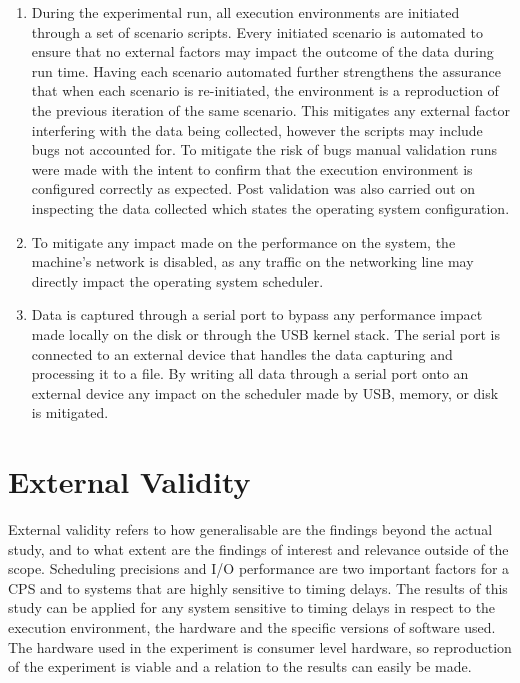 \begin{enumerate}
\item{During the experimental run, all execution environments are initiated through a set of scenario scripts. Every initiated scenario is automated to ensure that no external factors may impact the outcome of the data during run time. Having each scenario automated further strengthens the assurance that when each scenario is re-initiated, the environment is a reproduction of the previous iteration of the same scenario. This mitigates any external factor interfering with the data being collected, however the scripts may include bugs not accounted for. To mitigate the risk of bugs manual validation runs were made with the intent to confirm that the execution environment is configured correctly as expected. Post validation was also carried out on inspecting the data collected which states the operating system configuration.}
\item{To mitigate any impact made on the performance on the system, the machine's network is disabled, as any traffic on the networking line may directly impact the operating system scheduler.}
\item{Data is captured through a serial port to bypass any performance impact made locally on the disk or through the USB kernel stack. The serial port is connected to an external device that handles the data capturing and processing it to a file. By writing all data through a serial port onto an external device any impact on the scheduler made by USB, memory, or disk is mitigated.}
\end{enumerate}

\section{External Validity}
External validity refers to how generalisable are the findings beyond the actual study, and to what extent are the findings of interest and relevance outside of the scope. Scheduling precisions and I/O performance are two important factors for a CPS and to systems that are highly sensitive to timing delays. The results of this study can be applied for any system sensitive to timing delays in respect to the execution environment, the hardware and the specific versions of software used. The hardware used in the experiment is consumer level hardware, so reproduction of the experiment is viable and a relation to the results can easily be made. 

